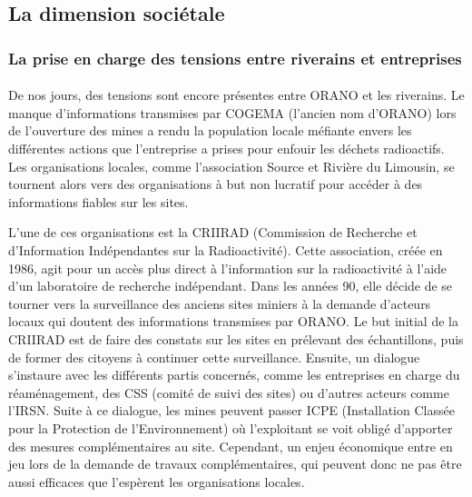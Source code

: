 \documentclass{article}
\begin{document}
\subsection{La dimension sociétale}
\subsubsection{La prise en charge des tensions entre riverains et entreprises}
\paragraph{} De nos jours, des tensions sont encore présentes entre ORANO et les riverains. Le manque d’informations transmises par COGEMA (l’ancien nom d’ORANO) lors de l’ouverture des mines a rendu la population locale méfiante envers les différentes actions que l’entreprise a prises pour enfouir les déchets radioactifs. Les organisations locales, comme l’association Source et Rivière du Limousin, se tournent alors vers des organisations à but non lucratif pour accéder à des informations fiables sur les sites. 

L’une de ces organisations est la CRIIRAD (Commission de Recherche et d'Information Indépendantes sur la Radioactivité). Cette association, créée en 1986, agit pour un accès plus direct à l’information sur la radioactivité à l’aide d’un laboratoire de recherche indépendant. Dans les années 90, elle décide de se tourner vers la surveillance des anciens sites miniers à la demande d’acteurs locaux qui doutent des informations transmises par ORANO. Le but initial de la CRIIRAD est de faire des constats sur les sites en prélevant des échantillons, puis de former des citoyens à continuer cette surveillance. Ensuite, un dialogue s'instaure avec les différents partis concernés, comme les entreprises en charge du réaménagement, des CSS (comité de suivi des sites) ou d’autres acteurs comme l’IRSN. Suite à ce dialogue, les mines peuvent passer ICPE (Installation Classée pour la Protection de l'Environnement) où l’exploitant se voit obligé d’apporter des mesures complémentaires au site. Cependant, un enjeu économique entre en jeu lors de la demande de travaux complémentaires, qui peuvent donc ne pas être aussi efficaces que l’espèrent les organisations locales. 
\end{document}
